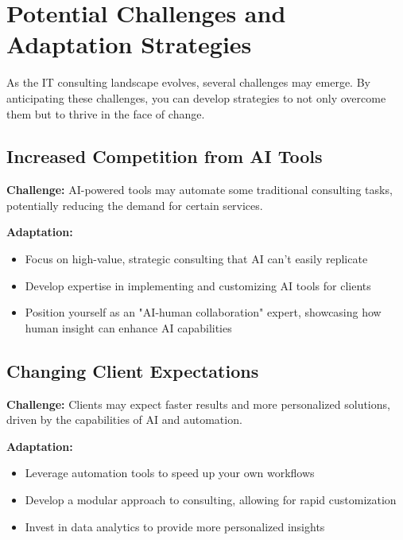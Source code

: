 
\section{Potential Challenges and Adaptation Strategies}

As the IT consulting landscape evolves, several challenges may emerge. By anticipating these challenges, you can develop strategies to not only overcome them but to thrive in the face of change.

\subsection{Increased Competition from AI Tools}

\textbf{Challenge:} AI-powered tools may automate some traditional consulting tasks, potentially reducing the demand for certain services.

\textbf{Adaptation:}
\begin{itemize}
    \item Focus on high-value, strategic consulting that AI can't easily replicate
    \item Develop expertise in implementing and customizing AI tools for clients
    \item Position yourself as an "AI-human collaboration" expert, showcasing how human insight can enhance AI capabilities
\end{itemize}

\subsection{Changing Client Expectations}

\textbf{Challenge:} Clients may expect faster results and more personalized solutions, driven by the capabilities of AI and automation.

\textbf{Adaptation:}
\begin{itemize}
    \item Leverage automation tools to speed up your own workflows
    \item Develop a modular approach to consulting, allowing for rapid customization
    \item Invest in data analytics to provide more personalized insights
\end{itemize}


